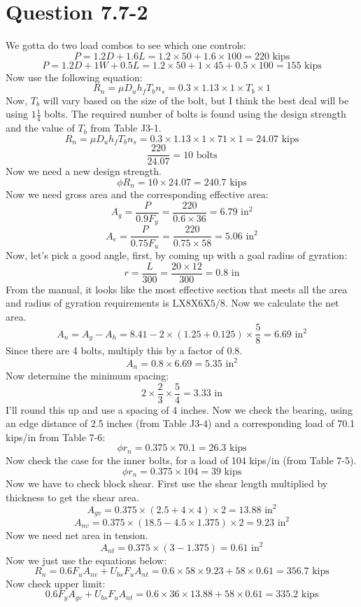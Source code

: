 \documentclass{article}
\begin{document}
\section*{Question 7.7-2}
We gotta do two load combos to see which one controls: 
\[P=1.2D+1.6L=1.2\times 50+1.6\times 100=220\text{ kips}\] 
\[P=1.2D+1W+0.5L=1.2\times 50+1\times 45+0.5\times 100=155\text{ kips}\] 
Now use the following equation: 
\[R_n=\mu D_u h_f T_b n_s=0.3\times 1.13\times 1\times T_b\times 1\] 
Now, $T_b$ will vary based on the size of the bolt, but I think the best deal will be using $1\frac{1}{4}$ bolts. The required number of bolts is found using the design strength and the value of $T_b$ from Table J3-1.
\[R_n=\mu D_u h_f T_b n_s=0.3\times 1.13\times 1\times 71\times 1=24.07\text{ kips}\] 
\[\frac{220}{24.07}=10\text{ bolts}\]
Now we need a new design strength. 
\[\phi R_n=10\times 24.07=240.7\text{ kips}\] 
Now we need gross area and the corresponding effective area: 
\[A_g=\frac{P}{0.9F_y}=\frac{220}{0.6\times 36}=6.79\text{ in}^2\] 
\[A_e=\frac{P}{0.75F_u}=\frac{220}{0.75\times 58}=5.06\text{ in}^2\] 
Now, let's pick a good angle, first, by coming up with a goal radius of gyration: 
\[r=\frac{L}{300}=\frac{20\times 12}{300}=0.8\text{ in}\] 
From the manual, it looks like the most effective section that meets all the area and radius of gyration requirements is $\boxed{\text{LX8X6X5/8}}$. Now we calculate the net area. 
\[A_n=A_g-A_h=8.41-2\times (1.25+0.125)\times \frac{5}{8}=6.69\text{ in}^2\] 
Since there are 4 bolts, multiply this by a factor of 0.8. 
\[A_n=0.8\times 6.69=5.35\text{ in}^2\] 
Now determine the minimum spacing: 
\[2\times \frac{2}{3}\times \frac{5}{4}=3.33\text{ in}\] 
I'll round this up and use a spacing of 4 inches. Now we check the bearing, using an edge distance of 2.5 inches (from Table J3-4) and a corresponding load of 70.1 kips/in from Table 7-6: 
\[\phi r_n=0.375\times 70.1=26.3\text{ kips}\] 
Now check the case for the inner bolts, for a load of 104 kips/in (from Table 7-5). 
\[\phi r_n=0.375\times 104=39 \text{ kips}\] 
Now we have to check block shear. First use the shear length multiplied by thickness to get the shear area. 
\[A_{gv}=0.375\times (2.5+4\times 4)\times 2=13.88\text{ in}^2\]
\[A_{nv}=0.375\times (18.5-4.5\times 1.375)\times 2=9.23\text{ in}^2\]
Now we need net area in tension. 
\[A_{nt}=0.375\times (3-1.375)=0.61\text{ in}^2\]
Now we just use the equations below:
\[R_n=0.6F_uA_{nv}+U_{bs}F_uA_{nt}=0.6\times 58\times 9.23+58\times 0.61=356.7\text{ kips}\]
Now check upper limit: 
\[0.6F_yA_{gv}+U_{bs}F_uA_{nt}=0.6\times 36\times13.88+58\times 0.61=335.2\text{ kips}\] 
\end{document}
